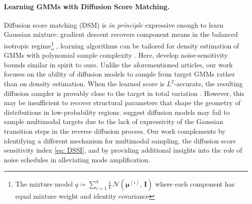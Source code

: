 \documentclass[11pt]{article}
\theoremstyle{plain}
\newcommand{\1}{\mathbbm{1}}
\begin{document}
\paragraph{Learning GMMs with Diffusion Score Matching.} 
Diffusion score matching (DSM) is \textit{in principle} expressive enough to learn Gaussian mixture: gradient descent recovers component means in the balanced isotropic regime\footnote{The mixture model $q\coloneqq \sum_{i=1}^k \frac{1}{k}\, \mathcal{N}(\boldsymbol{\mu}^{(i)},\, \mathbf{I})$ where each component has equal mixture weight and identity covariance} \citep{shah2023learning}, 
learning algorithms can be tailored for density estimation of GMMs with polynomial sample complexity \citep{gatmiry25b, chen2024learning}. Here, \citet{gatmiry25b} develop noise-sensitivity bounds similar in spirit to ours. Unlike the aforementioned articles, our work focuses on the ability of diffusion models to sample from target GMMs rather than on density estimation. 
When the learned score is $L^2$-accurate, the resulting diffusion sampler is provably close to the target in total variation \citep{chen2023sampling, lee2023convergence}. However, this may be insufficient to recover structural parameters that shape the geometry of distributions in low-probability regions. 
\citet{li2024softmixturedenoisingexpressive} suggest diffusion models may fail to sample multimodal targets due to the lack of expressivity of the Gaussian transition steps in the reverse diffusion process. 
Our work complements \citet{li2024softmixturedenoisingexpressive} by identifying a different mechanism for multimodal sampling, the diffusion score sensitivity index \eqref{eq: DSSI}, and by providing additional insights into the role of noise schedules in alleviating mode amplification.
\end{document}
